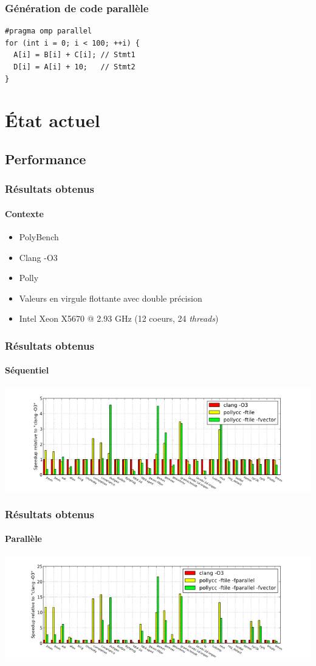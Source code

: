 \documentclass{beamer}
\begin{document}
\begin{frame}[fragile]
\frametitle{Génération de code parallèle}
\begin{lstlisting}
#pragma omp parallel
for (int i = 0; i < 100; ++i) {
  A[i] = B[i] + C[i]; // Stmt1
  D[i] = A[i] + 10;   // Stmt2
}
\end{lstlisting}
\end{frame}

\section{État actuel}
\subsection{Performance}
\begin{frame}
\frametitle{Résultats obtenus}
\framesubtitle{Contexte}
\begin{itemize}
\item PolyBench
\item Clang -O3
\item Polly
\item Valeurs en virgule flottante avec double précision
\item Intel Xeon X5670 @ 2.93 GHz (12 coeurs, 24 \textit{threads})
\end{itemize}
\end{frame}

\begin{frame}
\frametitle{Résultats obtenus}
\framesubtitle{Séquentiel}
\begin{center}
\colorbox{white}{\includegraphics[scale=0.36]{sequential-small.png}}
\end{center}
\end{frame}

\begin{frame}
\frametitle{Résultats obtenus}
\framesubtitle{Parallèle}
\begin{center}
\colorbox{white}{\includegraphics[scale=0.36]{parallel-small.png}}
\end{center}
\end{frame}
\end{document}

